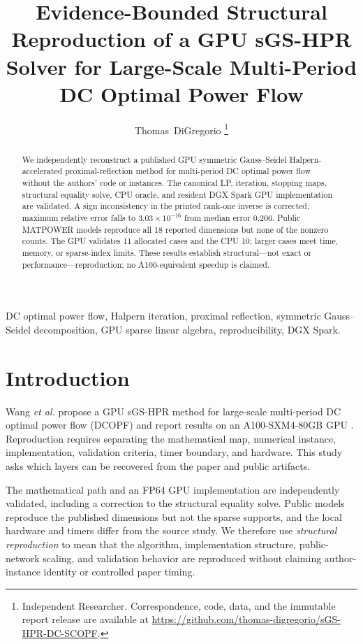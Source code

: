 \documentclass[10pt,journal]{IEEEtran}
\title{Evidence-Bounded Structural Reproduction of a GPU sGS-HPR Solver
for Large-Scale Multi-Period DC Optimal Power Flow}
\author{Thomas~DiGregorio%
\thanks{Independent Researcher. Correspondence, code, data, and the immutable
report release are available at
\url{https://github.com/thomas-digregorio/sGS-HPR-DC-SCOPF}.}}
\newcommand{\sgshpr}{sGS-HPR}
\begin{document}
\maketitle

\begin{abstract}
We independently reconstruct a published GPU symmetric Gauss--Seidel
Halpern-accelerated proximal-reflection method for multi-period DC optimal
power flow without the authors' code or instances. The canonical LP,
iteration, stopping maps, structural equality solve, CPU oracle, and resident
DGX Spark GPU implementation are validated. A sign inconsistency in the
printed rank-one inverse is corrected: maximum relative error falls to
$3.03\times10^{-16}$ from median error 0.206. Public MATPOWER models reproduce
all 18 reported dimensions but none of the nonzero counts. The GPU validates
11 allocated cases and the CPU 10; larger cases meet time, memory, or
sparse-index limits. These results establish structural---not exact or
performance---reproduction; no A100-equivalent speedup is claimed.
\end{abstract}

\begin{IEEEkeywords}
DC optimal power flow, Halpern iteration, proximal reflection, symmetric
Gauss--Seidel decomposition, GPU sparse linear algebra, reproducibility, DGX
Spark.
\end{IEEEkeywords}

\section{Introduction}

Wang \emph{et al.} propose a GPU \sgshpr{} method for large-scale
multi-period DC optimal power flow (DCOPF) and report results on an
A100-SXM4-80GB GPU \cite{wang2026}. Reproduction requires separating the
mathematical map, numerical instance, implementation, validation criteria,
timer boundary, and hardware. This study asks which layers can be recovered
from the paper and public artifacts.

The mathematical path and an FP64 GPU implementation are independently
validated, including a correction to the structural equality solve. Public
models reproduce the published dimensions but not the sparse supports, and
the local hardware and timers differ from the source study. We therefore use
\emph{structural reproduction} to mean that the algorithm, implementation
structure, public-network scaling, and validation behavior are reproduced
without claiming author-instance identity or controlled paper timing.
\end{document}
